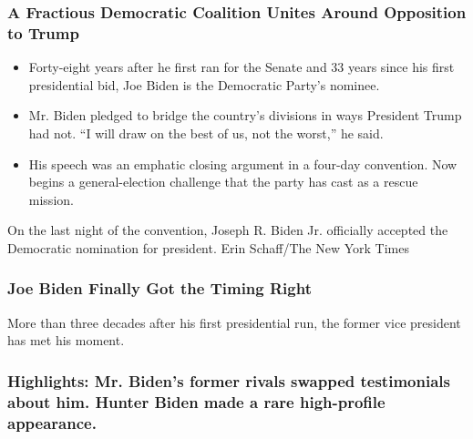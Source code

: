 \href{https://www.nytimes3xbfgragh.onion/2020/08/20/us/politics/Joe-Biden-accepts-democratic-nomination.html}{}

\hypertarget{a-fractious-democratic-coalition-unites-around-opposition-to-trump}{%
\subsubsection{A Fractious Democratic Coalition Unites Around Opposition
to
Trump}\label{a-fractious-democratic-coalition-unites-around-opposition-to-trump}}

\href{https://www.nytimes3xbfgragh.onion/2020/08/20/us/politics/Joe-Biden-accepts-democratic-nomination.html}{}

\begin{itemize}
\tightlist
\item
  Forty-eight years after he first ran for the Senate and 33 years since
  his first presidential bid, Joe Biden is the Democratic Party's
  nominee.
\item
  Mr. Biden pledged to bridge the country's divisions in ways President
  Trump had not. ``I will draw on the best of us, not the worst,'' he
  said.
\item
  His speech was an emphatic closing argument in a four-day convention.
  Now begins a general-election challenge that the party has cast as a
  rescue mission.
\end{itemize}

On the last night of the convention, Joseph R. Biden Jr. officially
accepted the Democratic nomination for president. Erin Schaff/The New
York Times

\href{https://www.nytimes3xbfgragh.onion/2020/08/20/us/politics/joe-biden-2020.html}{}

\hypertarget{joe-biden-finally-got-the-timing-right}{%
\subsubsection{Joe Biden Finally Got the Timing
Right}\label{joe-biden-finally-got-the-timing-right}}

\href{https://www.nytimes3xbfgragh.onion/2020/08/20/us/politics/joe-biden-2020.html}{}

More than three decades after his first presidential run, the former
vice president has met his moment.

\href{https://www.nytimes3xbfgragh.onion/live/2020/08/20/us/dnc-convention-election}{}

\hypertarget{highlights-mr-bidens-former-rivals-swapped-testimonials-about-him-hunter-biden-made-a-rare-high-profile-appearance}{%
\subsubsection{Highlights: Mr. Biden's former rivals swapped
testimonials about him. Hunter Biden made a rare high-profile
appearance.}\label{highlights-mr-bidens-former-rivals-swapped-testimonials-about-him-hunter-biden-made-a-rare-high-profile-appearance}}

